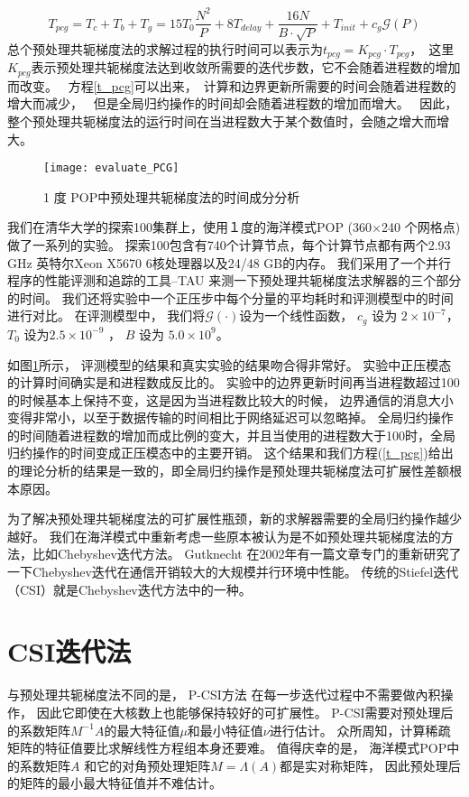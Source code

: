 \begin{equation}
\label{t_pcg}
T_{pcg} = T_c + T_b + T_g
= 15 T_0\frac{N^2}{P} + 8T_{delay} + \frac{16N}{B\cdot\sqrt{P}}+T_{init} +c_g\mathcal{G}(P)
\end{equation}
总个预处理共轭梯度法的求解过程的执行时间可以表示为$t_{pcg} = K_{pcg}\cdot T_{pcg}$，　这里$K_{pcg}$表示预处理共轭梯度法达到收敛所需要的迭代步数，它不会随着进程数的增加而改变。　
方程\ref{t_pcg}可以出来，　计算和边界更新所需要的时间会随着进程数的增大而减少，　
但是全局归约操作的时间却会随着进程数的增加而增大。　
因此，整个预处理共轭梯度法的运行时间在当进程数大于某个数值时，会随之增大而增大。　

\begin{figure}[ht]
\centering
\texttt{[image: evaluate\_PCG]}
\caption[] {1 度 POP中预处理共轭梯度法的时间成分分析\label{fig:pcg_ratio}}
\end{figure}

 
我们在清华大学的探索100集群上，使用１度的海洋模式POP (360$\times$240 个网格点)做了一系列的实验。 
探索100包含有740个计算节点，每个计算节点都有两个2.93 GHz 英特尔Xeon X5670 6核处理器以及24/48 GB的内存。 
我们采用了一个并行程序的性能评测和追踪的工具--TAU\cite{shende2006tau} 来测一下预处理共轭梯度法求解器的三个部分的时间。 
我们还将实验中一个正压步中每个分量的平均耗时和评测模型中的时间进行对比。 
在评测模型中， 我们将$\mathcal{G}(\cdot)$设为一个线性函数， $c_g$  设为 $2\times 10^{-7}$， $T_0$ 设为$2.5\times 10^{-9}$ ，  $B$  设为 $5.0\times 10^{9}$。 


如图\ref{fig:pcg_ratio}所示， 评测模型的结果和真实实验的结果吻合得非常好。 
实验中正压模态的计算时间确实是和进程数成反比的。 
实验中的边界更新时间再当进程数超过100的时候基本上保持不变，这是因为当进程数比较大的时候， 边界通信的消息大小变得非常小，以至于数据传输的时间相比于网络延迟可以忽略掉。 
全局归约操作的时间随着进程数的增加而成比例的变大，并且当使用的进程数大于100时，全局归约操作的时间变成正压模态中的主要开销。 
这个结果和我们方程(\ref{t_pcg})给出的理论分析的结果是一致的，即全局归约操作是预处理共轭梯度法可扩展性差额根本原因。 

为了解决预处理共轭梯度法的可扩展性瓶颈，新的求解器需要的全局归约操作越少越好。 
我们在海洋模式中重新考虑一些原本被认为是不如预处理共轭梯度法的方法，比如Chebyshev迭代方法。 
Gutknecht \cite{gutknecht2002chebyshev} 在2002年有一篇文章专门的重新研究了一下Chebyshev迭代在通信开销较大的大规模并行环境中性能。 
传统的Stiefel迭代（CSI）就是Chebyshev迭代方法中的一种。 


 
\section{CSI迭代法}
\label{solver:csi}
与预处理共轭梯度法不同的是， P-CSI方法 在每一步迭代过程中不需要做內积操作， 因此它即使在大核数上也能够保持较好的可扩展性。
P-CSI需要对预处理后的系数矩阵$M^{-1}A$的最大特征值$\mu$和最小特征值$\nu$进行估计。 
众所周知，计算稀疏矩阵的特征值要比求解线性方程组本身还要难。 
值得庆幸的是， 
海洋模式POP中的系数矩阵$A$ 和它的对角预处理矩阵$M = \Lambda(A)$都是实对称矩阵， 因此预处理后的矩阵的最小最大特征值并不难估计。 
 
